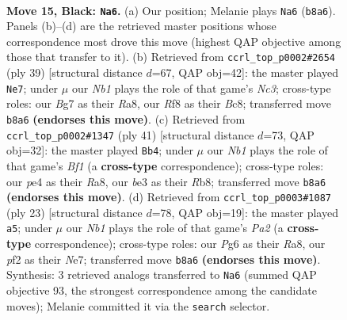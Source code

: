 \documentclass[11pt]{article}
\begin{document}
\clearpage

\begin{figure}[p]\centering
\begin{subfigure}{0.46\textwidth}\centering
\resizebox{\linewidth}{!}{%
\newchessgame
\chessboard[
  setfen={rn3r2/pppb1kb1/5pp1/4p2p/2P1P3/2N1BN2/PP3PP1/1R1BKR2 b - - 1 15},
  showmover=false,
  pgfstyle=straightmove, color=movearrow, markmove={b8-a6}
]}
\caption{}
\end{subfigure}\hfill
\begin{subfigure}{0.46\textwidth}\centering
\resizebox{\linewidth}{!}{%
\newchessgame
\chessboard[
  setfen={r1b4r/3k1pp1/p1npp3/1p4Pn/4PP2/2N1B3/PPPK4/3R1BR1 b - - 1 20},
  showmover=false,
  pgfstyle=straightmove, color=movearrow, markmove={c6-e7}
]}
\caption{}
\end{subfigure}
\\[4pt]
\begin{subfigure}{0.46\textwidth}\centering
\resizebox{\linewidth}{!}{%
\newchessgame
\chessboard[
  setfen={rr3bk1/2p2pnp/2b3p1/p3p3/4P3/2N1BPPP/PP2R1K1/R4B2 b - - 6 21},
  showmover=false,
  pgfstyle=straightmove, color=movearrow, markmove={f8-b4}
]}
\caption{}
\end{subfigure}\hfill
\begin{subfigure}{0.46\textwidth}\centering
\resizebox{\linewidth}{!}{%
\newchessgame
\chessboard[
  setfen={r1b1kb1r/ppp1npp1/2p4p/4P3/P7/2N2N1P/1PP2PP1/R1BR2K1 b - - 0 12},
  showmover=false,
  pgfstyle=straightmove, color=movearrow, markmove={a7-a5}
]}
\caption{}
\end{subfigure}
\caption{\textbf{Move 15, Black: \texttt{Na6}.} (a) Our position; Melanie plays \texttt{Na6} (\texttt{b8a6}). Panels (b)--(d) are the retrieved master positions whose correspondence most drove this move (highest QAP objective among those that transfer to it). (b) Retrieved from \texttt{ccrl\_top\_p0002\#2654} (ply 39) [structural distance $d$=67, QAP obj=42]: the master played \texttt{Ne7}; under $\mu$ our \emph{Nb1} plays the role of that game's \emph{Nc3}; cross-type roles: our \emph{B}g7 as their \emph{R}a8, our \emph{R}f8 as their \emph{B}c8; transferred move \texttt{b8a6} \textbf{(endorses this move)}. (c) Retrieved from \texttt{ccrl\_top\_p0002\#1347} (ply 41) [structural distance $d$=73, QAP obj=32]: the master played \texttt{Bb4}; under $\mu$ our \emph{Nb1} plays the role of that game's \emph{Bf1} (a \textbf{cross-type} correspondence); cross-type roles: our \emph{p}e4 as their \emph{R}a8, our \emph{b}e3 as their \emph{R}b8; transferred move \texttt{b8a6} \textbf{(endorses this move)}. (d) Retrieved from \texttt{ccrl\_top\_p0003\#1087} (ply 23) [structural distance $d$=78, QAP obj=19]: the master played \texttt{a5}; under $\mu$ our \emph{Nb1} plays the role of that game's \emph{Pa2} (a \textbf{cross-type} correspondence); cross-type roles: our \emph{P}g6 as their \emph{R}a8, our \emph{p}f2 as their \emph{N}e7; transferred move \texttt{b8a6} \textbf{(endorses this move)}. Synthesis: 3 retrieved analogs transferred to \texttt{Na6} (summed QAP objective 93, the strongest correspondence among the candidate moves); Melanie committed it via the \texttt{search} selector.}
\label{fig:thought-m29}
\end{figure}
\end{document}
